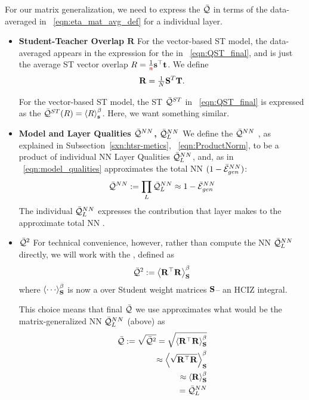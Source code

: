 For our matrix generalization, we need to express the \LayerQuality $\bar{\mathcal{Q}}$ in terms of the data-averaged
\SelfOverlap in \EQN~\ref{eqn:eta_mat_avg_def} for a individual layer.
\begin{itemize}
\item
\textbf{Student-Teacher Overlap  $\mathbf{R}$}
For the vector-based \Perceptron ST model, the data-averaged \SelfOverlap appears in the expression for the
\LayerQuality  in \EQN~\ref{eqn:QST_final}, and is just the average ST vector overlap $R=\frac{1}{{\color{red}\sf{n}}}{\mathbf{s}}^{\top}{\mathbf{t}}$. 
We define 
\begin{equation}
\mathbf{R} = \tfrac{1}{N} {\mathbf{S}}^{T} {\mathbf{T}}  .
\end{equation}

For the vector-based ST model, the ST \Quality $\bar{\mathcal{Q}}^{ST}$ in \EQN~\ref{eqn:QST_final} is expressed as
the \ThermalAverage $\bar{\mathcal{Q}}^{ST}(R)=\left\langle R \right\rangle_{\mathbf s}^{\beta}$. Here, we want something similar.
\item
\textbf{Model and Layer Qualities $\bar{\mathcal{Q}}^{NN}$, $\bar{\mathcal{Q}}^{NN}_{L}$}
We define the \ModelQuality $\bar{\mathcal{Q}}^{NN}$ ,
as explained in Subsection~\ref{sxn:htsr-metics}, \EQN~\ref{eqn:ProductNorm},
to be a product of individual NN Layer Qualities $\bar{\mathcal{Q}}^{NN}_{L}$,
and, as in \EQN~\ref{eqn:model_qualities}
approximates the total NN \AverageGeneralizationAccuracy $(1-\bar{\mathcal{E}}_{gen}^{NN})$:
\begin{equation}
 \bar{\mathcal{Q}}^{NN}:=\prod_{L}\bar{\mathcal{Q}}^{NN}_{L}\approx 1-\bar{\mathcal{E}}_{gen}^{NN} 
\end{equation}
The individual $\bar{\mathcal{Q}}^{NN}_{L}$ expresses the contribution that layer makes
to the approximate total NN \AverageGeneralizationAccuracy.
\item
 \textbf{\LayerQualitySquared $\bar{\mathcal{Q}}^{2}$}
For  technical convenience, however, rather than compute
the NN \LayerQuality $\bar{\mathcal{Q}}^{NN}_{L}$ directly, we will work with the \emph{\AverageLayerQualitySquared}, 
defined as
\begin{align}
  \label{eqn:QT_1}
  \bar{\mathcal{Q}}^{2}:=\left\langle {\mathbf{R}}^{\top}\mathbf{R} \right\rangle_{\mathbf S}^{\beta}
\end{align}
where  $\THRMAVGIZ{\cdots}$ is now a \ThermalAverage over Student weight matrices ${\mathbf{S}}$--
an HCIZ integral.

This choice means that final \LayerQuality $\bar{\mathcal{Q}}$ we use approximates what would be the
matrix-generalized NN \LayerQuality $\bar{\mathcal{Q}}^{NN}_{L}$ (above) as
\begin{align}
  \label{eqn:QT_2}
  \bar{\mathcal{Q}}:=\sqrt{\bar{\mathcal{Q}}^{2}}
  =\sqrt{\left\langle {\mathbf{R}}^{\top}\mathbf{R} \right\rangle_{\mathbf S}^{\beta}} \\ \nonumber
  \approx\left\langle \sqrt{{\mathbf{R}}^{\top}\mathbf{R}} \right\rangle_{\mathbf S}^{\beta} \\ \nonumber
  \approx\left\langle \mathbf{R} \right\rangle_{\mathbf S}^{\beta} \\ \nonumber
  = \bar{\mathcal{Q}}^{NN}_{L}
\end{align}


\end{itemize}
